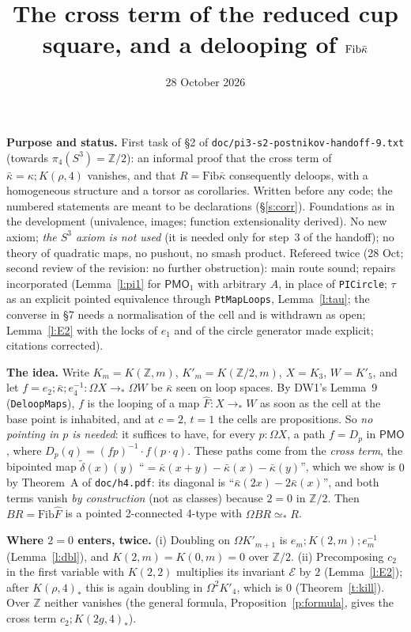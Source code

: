 \documentclass[11pt]{amsart}
\title{The cross term of the reduced cup square, and a delooping of $\Fib\bar\kappa$}
\date{28 October 2026}
\theoremstyle{definition}
\theoremstyle{remark}
\newcommand{\Om}{\Omega}
\newcommand{\Z}{\mathbb{Z}}
\newcommand{\code}[1]{\texttt{#1}}
\newcommand{\PMO}{\mathsf{PMO}}
\newcommand{\Fib}{\mathrm{Fib}}
\newcommand{\kb}{\bar\kappa}
\newcommand{\cE}{\mathcal E}
\begin{document}
\maketitle

\noindent\textbf{Purpose and status.} First task of \S2 of
\code{doc/pi3-s2-postnikov-handoff-9.txt} (towards $\pi_4(S^3)=\Z/2$):
an informal proof that the cross term of $\kb=\kappa;K(\rho,4)$
vanishes, and that $R=\Fib\kb$ consequently deloops, with a homogeneous
structure and a torsor as corollaries. Written before any code; the
numbered statements are meant to be declarations (\S\ref{s:corr}).
Foundations as in the development (univalence, images; function
extensionality derived). No new axiom; \emph{the $S^3$ axiom is not used}
(it is needed only for step~3 of the handoff); no theory of quadratic
maps, no pushout, no smash product. Refereed twice (28 Oct; second review of the revision: no further
obstruction): main route sound; repairs incorporated
(Lemma~\ref{l:pi1} for $\PMO_1$ with arbitrary $A$, in place of
\code{PICircle}; $\tau$ as an explicit pointed equivalence through
\code{PtMapLoops}, Lemma~\ref{l:tau}; the converse in \S7 needs a
normalisation of the cell and is withdrawn as open; Lemma~\ref{l:E2}
with the locks of $e_1$ and of the circle generator made explicit;
citations corrected).

\smallskip\noindent\textbf{The idea.} Write $K_m=K(\Z,m)$, $K'_m=K(\Z/2,m)$,
$X=K_3$, $W=K'_5$, and let $f=e_2;\kb;e_4^{-1}:\Om X\to_*\Om W$ be $\kb$
seen on loop spaces. By DW1's Lemma~9 (\code{DeloopMaps}), $f$ is the
looping of a map $\hat F:X\to_*W$ as soon as the cell at the base point
is inhabited, and at $c=2$, $t=1$ the cells are propositions. So
\emph{no pointing in $p$ is needed}: it suffices to have, for every
$p:\Om X$, a path $f=D_p$ in $\PMO$, where $D_p(q)=(fp)^{-1}\cdot f(p\cdot q)$.
These paths come from the \emph{cross term}, the bipointed map
$\tilde\delta(x)(y)$ ``$=\kb(x+y)-\kb(x)-\kb(y)$'', which we show is
$0$ by Theorem~A of \code{doc/h4.pdf}: its diagonal is
``$\kb(2x)-2\kb(x)$'', and both terms vanish \emph{by construction} (not as
classes) because $2=0$ in $\Z/2$. Then $BR=\Fib\hat F$ is a pointed
2-connected 4-type with $\Om BR\simeq_*R$.

\smallskip\noindent\textbf{Where $2=0$ enters, twice.} (i) Doubling on
$\Om K'_{m+1}$ is $e_m;K(2,m);e_m^{-1}$ (Lemma~\ref{l:dbl}), and
$K(2,m)=K(0,m)=0$ over $\Z/2$. (ii) Precomposing $c_2$ in the first
variable with $K(2,2)$ multiplies its invariant $\cE$ by $2$
(Lemma~\ref{l:E2}); after $K(\rho,4)_*$ this is again doubling in
$\Om^2K'_4$, which is $0$ (Theorem~\ref{t:kill}). Over $\Z$ neither
vanishes (the general formula, Proposition~\ref{p:formula}, gives the
cross term $c_2;K(2g,4)_*$).
\end{document}
